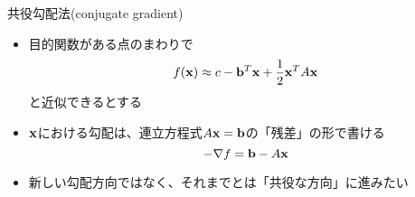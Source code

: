 \begin{frame}[t,fragile]{共役勾配法(conjugate gradient)}
  \begin{itemize}
    \setlength{\itemsep}{1em}
  \item 目的関数がある点のまわりで
    \[
    f({\bf x}) \approx c - {\bf b}^T {\bf x} + \frac{1}{2} {\bf x}^T A {\bf x}
    \]
    と近似できるとする
  \item ${\bf x}$における勾配は、連立方程式$A{\bf x}={\bf b}$の「残差」の形で書ける
    \[
    -\nabla f = {\bf b} - A {\bf x}
    \]
  \item 新しい勾配方向ではなく、それまでとは「共役な方向」に進みたい
  \end{itemize}
\end{frame}

